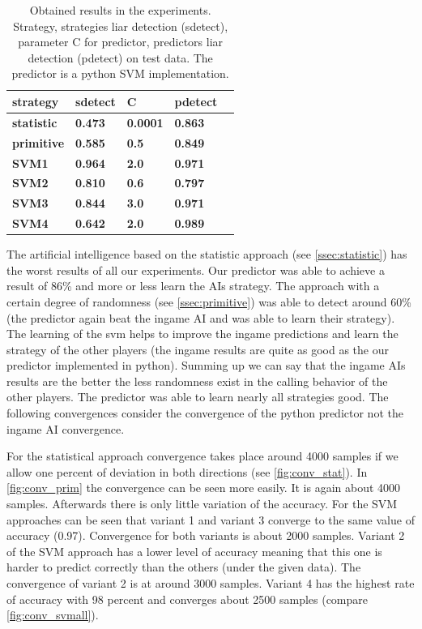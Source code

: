 \documentclass[11pt]{article}
\begin{document}
\begin{table}[H]
\centering
\small
\begin{tabular}{|l|l|l|l|l|}
\hline
\textbf{strategy}&\textbf{sdetect}&\textbf{C}&\textbf{pdetect} \\ \hline
\textbf{statistic}&\textbf{0.473}&\textbf{0.0001}&\textbf{0.863} \\ \hline
\textbf{primitive}&\textbf{0.585}&\textbf{0.5}&\textbf{0.849} \\ \hline
\textbf{SVM1}&\textbf{0.964}&\textbf{2.0}&\textbf{0.971} \\ \hline
\textbf{SVM2}&\textbf{0.810}&\textbf{0.6}&\textbf{0.797}\\ \hline 
\textbf{SVM3}&\textbf{0.844}&\textbf{3.0}&\textbf{0.971}\\ \hline 
\textbf{SVM4}&\textbf{0.642}&\textbf{2.0}&\textbf{0.989} \\ \hline
\end{tabular}
\caption{Obtained results in the experiments. Strategy, strategies liar detection (sdetect), parameter C for predictor, predictors liar detection (pdetect) on test data. The predictor is a python SVM implementation.}
\label{tab:results}
\end{table}

The artificial intelligence based on the statistic approach (see \cref{ssec:statistic}) has the worst results of all our experiments. Our predictor was able to achieve a result of 86\% and more or less learn the AIs strategy.
The approach with a certain degree of randomness (see \cref{ssec:primitive}) was able to detect around 60\% (the predictor again beat the ingame AI and was able to learn their strategy).
The learning of the svm helps to improve the ingame predictions and learn the strategy of the other players (the ingame results are quite as good as the our predictor implemented in python).
Summing up we can say that the ingame AIs results are the better the less randomness exist in the calling behavior of the other players.
The predictor was able to learn nearly all strategies good.
The following convergences consider the convergence of the python predictor not the ingame AI convergence.

For the statistical approach convergence takes place around 4000 samples if we allow one percent of deviation in both directions (see \cref{fig:conv_stat}). 
In \cref{fig:conv_prim} the convergence can be seen more easily. It is again about 4000 samples. Afterwards there is only little variation of the accuracy. 
For the SVM approaches can be seen that variant 1 and variant 3 converge to the same value of accuracy (0.97). Convergence for both variants is about 2000 samples. Variant 2 of the SVM approach has a lower level of accuracy meaning that this one is harder to predict correctly than the others (under the given data). The convergence of variant 2 is at around 3000 samples. Variant 4 has the highest rate of accuracy with 98 percent and converges about 2500 samples (compare \cref{fig:conv_svmall}).
\end{document}
